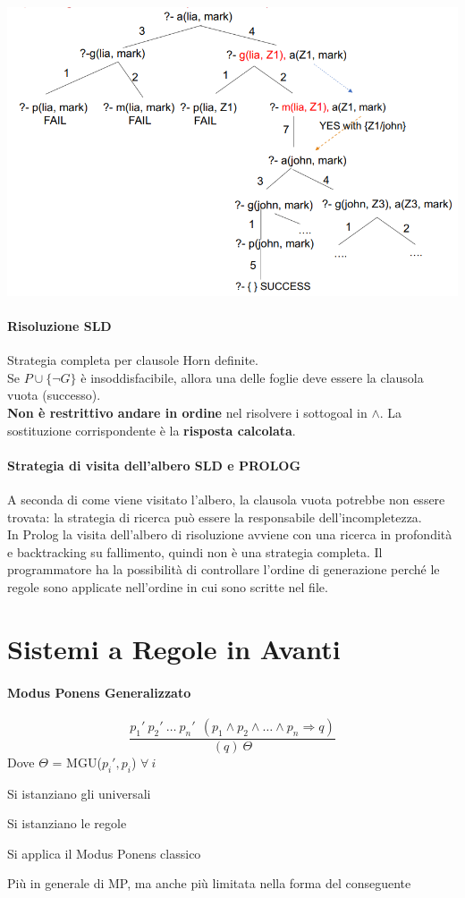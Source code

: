 \documentclass[10pt]{book}
\begin{document}
\begin{center}
\includegraphics[scale=0.7]{sldesempio.png}
\end{center}
\pagebreak
\paragraph{Risoluzione SLD} Strategia completa per clausole Horn definite.\\
Se $P \cup \{\neg G\}$ è insoddisfacibile, allora una delle foglie deve essere la clausola vuota (successo).\\
\textbf{Non è restrittivo andare in ordine} nel risolvere i sottogoal in $\wedge$. La sostituzione corrispondente è la \textbf{risposta calcolata}.
\paragraph{Strategia di visita dell'albero SLD e PROLOG} A seconda di come viene visitato l'albero, la clausola vuota potrebbe non essere trovata: la strategia di ricerca può essere la responsabile dell'incompletezza.\\
In Prolog la visita dell'albero di risoluzione avviene con una ricerca in profondità e backtracking su fallimento, quindi non è una strategia completa. Il programmatore ha la possibilità di controllare l'ordine di generazione perché le regole sono applicate nell'ordine in cui sono scritte nel file.
\section{Sistemi a Regole in Avanti}
\paragraph{Modus Ponens Generalizzato}
$$\frac{p_1'\: p_2'\: \ldots\: p_n'\:\:(p_1\wedge p_2\wedge\ldots\wedge p_n\Rightarrow q)}{(q)\:\Theta} $$
Dove $\Theta$ = MGU($p_i', p_i$) $\forall\: i$\\
\begin{list}{}{Regola \textbf{corretta}:}
	\item Si istanziano gli universali
	\item Si istanziano le regole
	\item Si applica il Modus Ponens classico
\end{list}
Più in generale di MP, ma anche più limitata nella forma del conseguente
\end{document}
